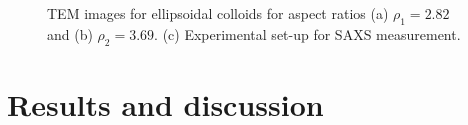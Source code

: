 \documentclass[aps,prl,preprint,superscriptaddress]{revtex4-1} %
\begin{document}
\begin{figure}[!h]
\caption{TEM images for ellipsoidal colloids for aspect ratios (a) $\rho_1=2.82$ and (b) $\rho_2=3.69$. (c) Experimental set-up for SAXS measurement.}\label{TEM}
\end{figure}
\section{Results and discussion}
\end{document}

